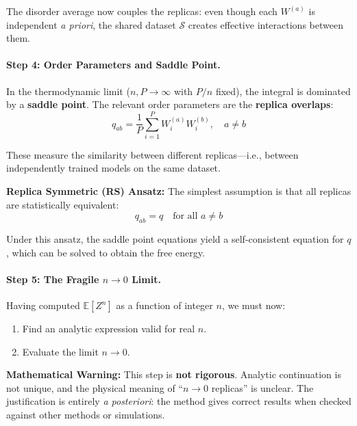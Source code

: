 \documentclass[
  journal=largetwo,
  year=2025,
  volume=37,
]{cup-journal}
\begin{document}
The disorder average now couples the replicas: even though each $W^{(a)}$ is independent \textit{a priori}, the shared dataset $\mathcal{S}$ creates effective interactions between them.

\paragraph{Step 4: Order Parameters and Saddle Point.}

In the thermodynamic limit ($n, P \to \infty$ with $P/n$ fixed), the integral is dominated by a \textbf{saddle point}. The relevant order parameters are the \textbf{replica overlaps}:
\begin{equation}
    q_{ab} = \frac{1}{P} \sum_{i=1}^{P} W_i^{(a)} W_i^{(b)}, \quad a \neq b
\end{equation}

These measure the similarity between different replicas---i.e., between independently trained models on the same dataset.

\textbf{Replica Symmetric (RS) Ansatz:} The simplest assumption is that all replicas are statistically equivalent:
\begin{equation}
    q_{ab} = q \quad \text{for all } a \neq b
\end{equation}

Under this ansatz, the saddle point equations yield a self-consistent equation for $q$, which can be solved to obtain the free energy.

\paragraph{Step 5: The Fragile $n \to 0$ Limit.}

Having computed $\mathbb{E}[Z^n]$ as a function of integer $n$, we must now:
\begin{enumerate}
    \item Find an analytic expression valid for real $n$.
    \item Evaluate the limit $n \to 0$.
\end{enumerate}

\textbf{Mathematical Warning:} This step is \textbf{not rigorous}. Analytic continuation is not unique, and the physical meaning of ``$n \to 0$ replicas'' is unclear. The justification is entirely \textit{a posteriori}: the method gives correct results when checked against other methods or simulations.
\end{document}
